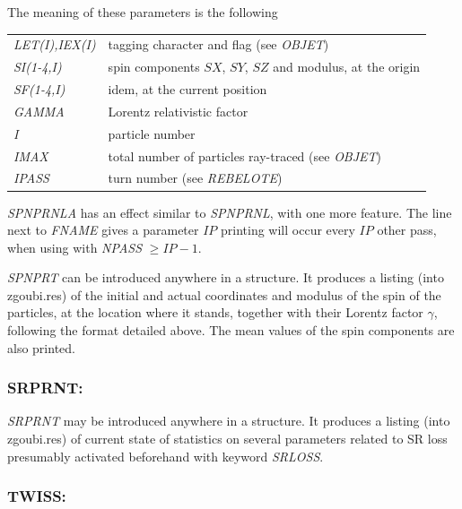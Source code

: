 \noindent The meaning of these parameters is the following 
\bigskip

 \begin{tabular}{>{\sl}l!{:}l}
	 LET(I),IEX(I)  &  tagging character and flag (see \textsl{OBJET}) \\
	 SI(1-4,I) & spin components $SX$, $SY$, $SZ$  and modulus, at the origin\\
	 SF(1-4,I)   &  idem, at the current position\\
	  GAMMA &   Lorentz relativistic factor\\
	  I  &  particle number\\
	 IMAX &  total number of particles ray-traced (see  \textsl{OBJET})\\
	 IPASS &  turn number (see \textsl{REBELOTE})\\
 \end{tabular}
\bigskip

\noindent\textsl{SPNPRNLA} has an effect similar to \textsl{SPNPRNL}, with 
one more feature. The  line next to  \textsl{FNAME}  gives a parameter $IP$ 
printing will occur every $IP$ other pass, when 
using \REBELOTE{} with \textsl{NPASS} $ \geq IP-1$. 
\bigskip

\noindent\textsl{SPNPRT} can be introduced anywhere in a structure. It produces
a listing (into zgoubi.res) of the initial and actual coordinates and modulus of the spin of the \IMAX{}
particles, at the location where it stands, together with their Lorentz factor $\gamma$, following the format detailed above. 
The mean values of the spin components are also printed. 

\newpage

\subsubsection*{SRPRNT: \SRPRNTTitl}\label{SRPRNT}

\noindent\textsl{SRPRNT} may be introduced anywhere in a structure. It produces
a listing (into zgoubi.res) of current state of statistics on several parameters related to 
SR loss  presumably  activated beforehand with keyword \textsl{SRLOSS}. 

 \newpage


\subsubsection*{TWISS: \TWISSTitl}\label{TWISS} 
\medskip

